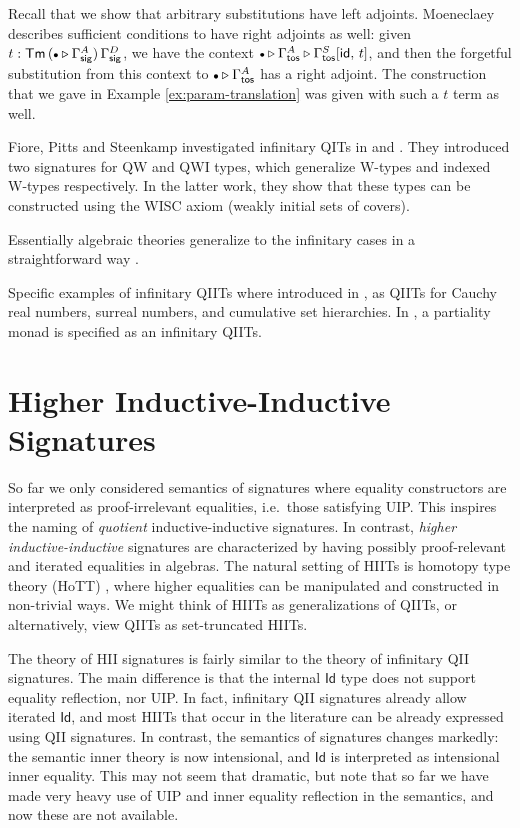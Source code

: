 \documentclass[12pt,a4paper,twoside,openany]{book}
\theoremstyle{remark}
\theoremstyle{definition}
\theoremstyle{theorem}
\newcommand{\ms}[1]{\mathsf{#1}}
\newcommand{\id}{\mathsf{id}}
\newcommand{\Tm}{\mathsf{Tm}}
\newcommand{\Id}{\mathsf{Id}}
\newcommand{\ext}{\triangleright}
\newcommand{\emptycon}{\scaleobj{.75}\bullet}
\begin{document}
Recall that we show that arbitrary substitutions have left adjoints. Moeneclaey
\cite{semicubical} describes sufficient conditions to have right adjoints as
well: given $t : \Tm\,(\emptycon \ext
\Gamma^A_{\ms{sig}})\,\Gamma^D_{\ms{sig}}$, we have the context
$\emptycon\ext\Gamma^A_{\ms{tos}}\ext\Gamma^S_{\ms{tos}}[\id,\,t]$, and then the
forgetful substitution from this context to $\emptycon\ext\Gamma^A_{\ms{tos}}$
has a right adjoint. The construction that we gave in
Example \ref{ex:param-translation} was given with such a $t$ term as well.

Fiore, Pitts and Steenkamp investigated infinitary QITs in \cite{inf-qits} and
\cite{DBLP:journals/corr/abs-2101-02994}. They introduced two signatures for QW
and QWI types, which generalize W-types and indexed W-types respectively. In the
latter work, they show that these types can be constructed using the WISC axiom
(weakly initial sets of covers).

Essentially algebraic theories generalize to the infinitary cases in a
straightforward way \cite{adamek1994locally}.

Specific examples of infinitary QIITs where introduced in \cite{hottbook}, as
QIITs for Cauchy real numbers, surreal numbers, and cumulative set hierarchies.
In \cite{partiality}, a partiality monad is specified as an infinitary QIITs.

\chapter{Higher Inductive-Inductive Signatures}
\label{chap:hiit}

So far we only considered semantics of signatures where equality constructors
are interpreted as proof-irrelevant equalities, i.e.\ those satisfying UIP. This
inspires the naming of \emph{quotient} inductive-inductive signatures. In
contrast, \emph{higher inductive-inductive} signatures are characterized by
having possibly proof-relevant and iterated equalities in algebras. The natural
setting of HIITs is homotopy type theory (HoTT) \cite{hottbook}, where higher
equalities can be manipulated and constructed in non-trivial ways. We might
think of HIITs as generalizations of QIITs, or alternatively, view QIITs as
set-truncated HIITs.

The theory of HII signatures is fairly similar to the theory of infinitary QII
signatures. The main difference is that the internal $\Id$ type does not support
equality reflection, nor UIP. In fact, infinitary QII signatures already allow
iterated $\Id$, and most HIITs that occur in the literature can be already
expressed using QII signatures. In contrast, the semantics of signatures changes
markedly: the semantic inner theory is now intensional, and $\Id$ is interpreted
as intensional inner equality. This may not seem that dramatic, but note that so
far we have made very heavy use of UIP and inner equality reflection in the
semantics, and now these are not available.
\end{document}
